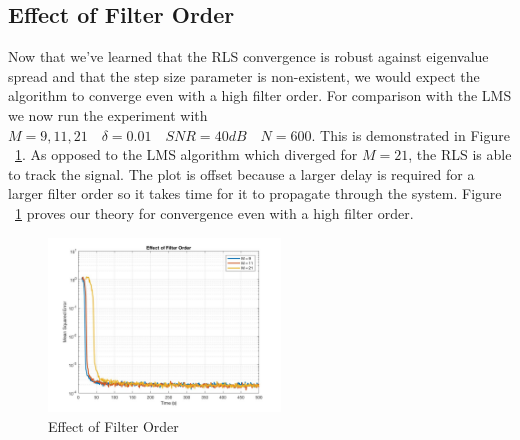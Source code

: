 \documentclass[journal]{IEEEtran}
\begin{document}
\subsection{Effect of Filter Order}
Now that we've learned that the RLS convergence is robust against eigenvalue spread
and that the step size parameter is non-existent, we would expect the algorithm to
converge even with a high filter order. For comparison with the LMS we now run the experiment with
$M = 9, 11, 21 \quad \delta = 0.01 \quad SNR = 40dB \quad N = 600$. This is demonstrated in Figure ~\ref{fig:filterorder2}.
As opposed to the LMS algorithm which diverged for $ M = 21$, the RLS is able to track the signal. The plot is offset because
a larger delay is required for a larger filter order so it takes time for it to propagate through the system. Figure ~\ref{fig:filterorder2}
proves our theory for convergence even with a high filter order.
\begin{figure}[H]
  \centering
  \captionsetup{justification=centering,font = small}
  \includegraphics[width=0.55\textwidth, inner] {Plots/Project2_filterorder.jpg}
  \caption{Effect of Filter Order}
    \label{fig:filterorder2}
\end{figure}
\end{document}
